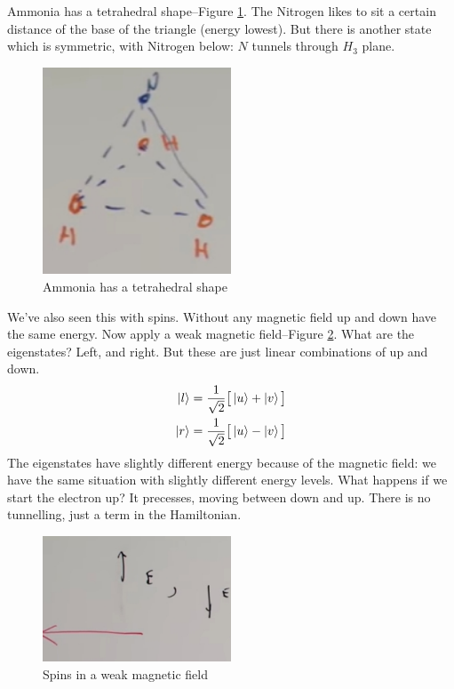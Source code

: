 \documentclass[]{article}
\begin{document}
Ammonia has a tetrahedral shape--Figure \ref{fig:aqm-8-nh3}. The Nitrogen likes to sit a certain distance of the base of the triangle (energy lowest). But there is another state which is symmetric, with Nitrogen below: $N$ tunnels through $H_3$ plane. 

\begin{figure}[H]
	\begin{center}
		\caption{Ammonia has a tetrahedral shape}\label{fig:aqm-8-nh3}
		\includegraphics[width=0.5\textwidth]{aqm-8-nh3}
	\end{center}
\end{figure}

We've also seen this with spins. Without any magnetic field up and down have the same energy. Now apply a weak magnetic field--Figure \ref{fig:aqm-8-spins-lr}. What are the eigenstates? Left, and right. But these are just linear combinations of up and down.
\begin{align*}
	\ket{l} = \frac{1}{\sqrt{2}}\big[\ket{u} + \ket{v}\big]\\
	\ket{r} = \frac{1}{\sqrt{2}}\big[\ket{u} - \ket{v}\big]
\end{align*}
The eigenstates have slightly different energy because of the magnetic field: we have the same situation with slightly different energy levels. What happens if we start the electron up? It precesses, moving between down and up. There is no tunnelling, just a term in the Hamiltonian. 

\begin{figure}[H]
	\begin{center}
		\caption{Spins in a weak magnetic field}\label{fig:aqm-8-spins-lr}
		\includegraphics[width=0.5\textwidth]{aqm-8-spins-lr}
	\end{center}
\end{figure}
\end{document}

